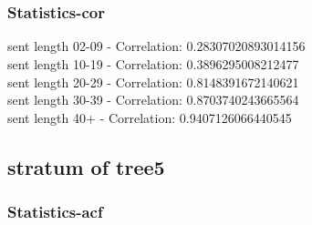 \documentclass{article}%
\begin{document}
\begin{figure}[ht]%
\centering%
\setlength{\abovecaptionskip}{-35pt}%
%
%
\\%
%
%
\\%
%
\end{figure}

%
\newpage%
\subsubsection{Statistics{-}cor}%
\label{ssubsec:Statistics{-}cor}%
\noindent%
sent length 02-09 - Correlation: 0.28307020893014156\\%
sent length 10-19 - Correlation: 0.3896295008212477\\%
sent length 20-29 - Correlation: 0.8148391672140621\\%
sent length 30-39 - Correlation: 0.8703740243665564\\%
sent length 40+ - Correlation: 0.9407126066440545\\

%
\newpage

%
\subsection{stratum of tree5}%
\label{subsec:stratumoftree5}%
\subsubsection{Statistics{-}acf}%
\label{ssubsec:Statistics{-}acf}%
\end{document}
